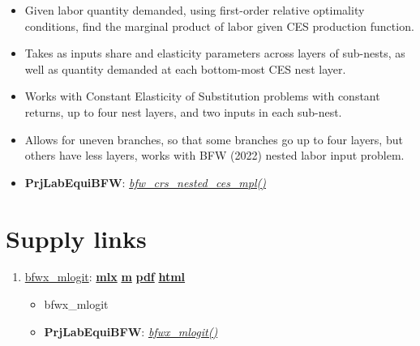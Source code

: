 \documentclass[
]{book}
\providecommand{\tightlist}{%
  \setlength{\itemsep}{0pt}\setlength{\parskip}{0pt}}
\begin{document}
\begin{enumerate}
  \begin{itemize}
  \tightlist
  \item
    Given labor quantity demanded, using first-order relative optimality conditions, find the marginal product of labor given CES production function.
  \item
    Takes as inputs share and elasticity parameters across layers of sub-nests, as well as quantity demanded at each bottom-most CES nest layer.
  \item
    Works with Constant Elasticity of Substitution problems with constant returns, up to four nest layers, and two inputs in each sub-nest.
  \item
    Allows for uneven branches, so that some branches go up to four layers, but others have less layers, works with BFW (2022) nested labor input problem.
  \item
    \textbf{PrjLabEquiBFW}: \emph{\href{https://github.com/FanWangEcon/PrjLabEquiBFW/blob/main/PrjLabEquiBFW/solvedemand/bfw_crs_nested_ces_mpl.m}{bfw\_crs\_nested\_ces\_mpl()}}
  \end{itemize}
\end{enumerate}

\hypertarget{supply-links}{%
\section{Supply links}\label{supply-links}}

\begin{enumerate}
\def\labelenumi{\arabic{enumi}.}
\tightlist
\item
  \href{https://fanwangecon.github.io/PrjLabEquiBFW/PrjLabEquiBFW/doc/solvesupply/htmlpdfm/bfwx_mlogit.html}{bfwx\_mlogit}: \href{https://github.com/FanWangEcon/PrjLabEquiBFW/blob/master/PrjLabEquiBFW/doc/solvesupply/bfwx_mlogit.mlx}{\textbf{mlx}} \textbar{} \href{https://github.com/FanWangEcon/PrjLabEquiBFW/blob/master/PrjLabEquiBFW/doc/solvesupply/htmlpdfm/bfwx_mlogit.m}{\textbf{m}} \textbar{} \href{https://github.com/FanWangEcon/PrjLabEquiBFW/blob/master/PrjLabEquiBFW/doc/solvesupply/htmlpdfm/bfwx_mlogit.pdf}{\textbf{pdf}} \textbar{} \href{https://fanwangecon.github.io/PrjLabEquiBFW/PrjLabEquiBFW/doc/solvesupply/htmlpdfm/bfwx_mlogit.html}{\textbf{html}}

  \begin{itemize}
  \tightlist
  \item
    bfwx\_mlogit
  \item
    \textbf{PrjLabEquiBFW}: \emph{\href{https://github.com/FanWangEcon/PrjLabEquiBFW/blob/main/PrjLabEquiBFW/solvesupply/bfwx_mlogit.m}{bfwx\_mlogit()}}
  \end{itemize}
\end{enumerate}
\end{document}
